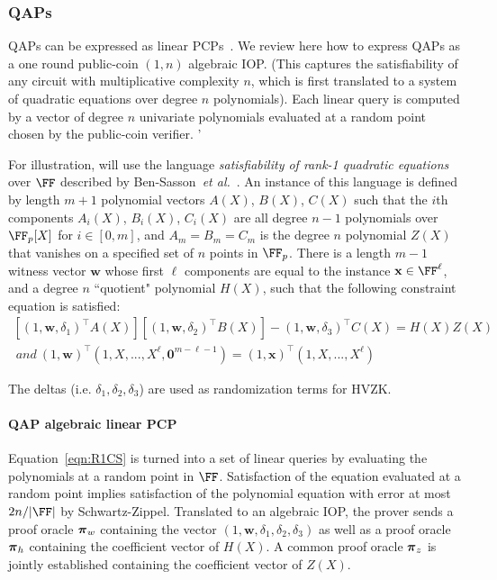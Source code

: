 \subsubsection{QAPs} 

QAPs can be expressed as linear PCPs~\cite{TCC:BCIOP13,C:BCGTV13}. We review here how to express QAPs as a one round public-coin $(1, n)$ algebraic IOP. (This captures the satisfiability of any circuit with multiplicative complexity $n$, which is first translated to a system of quadratic equations over degree $n$ polynomials). Each linear query is computed by a vector of degree $n$ univariate polynomials evaluated at a random point chosen by the public-coin verifier. '

For illustration, will use the language \emph{satisfiability of rank-1 quadratic equations} over $\FF$ described by Ben-Sasson~\emph{et al.}~\cite{C:BCGTV13}. An instance of this language is defined by length $m+1$ polynomial vectors $A(X)$, $B(X)$, $C(X)$ such that the $i$th components $A_i(X)$, $B_i(X)$, $C_i(X)$ are all degree $n-1$ polynomials over $\FF_p[X]$ for $i \in [0,m]$, and $A_m = B_m = C_m$ is the degree $n$ polynomial $Z(X)$ that vanishes on a specified set of $n$ points in $\FF_p$. There is a length $m-1$ witness vector $\mathbf{w}$ whose first $\ell$ components are equal to the instance $\mathbf{x} \in \FF^\ell$, and a degree $n$ ``quotient" polynomial $H(X)$, such that the following constraint equation is satisfied: 
\begin{equation} \label{eqn:R1CS} 
\begin{split}
[(1, \mathbf{w}, \delta_1)^\top A(X)][(1, \mathbf{w}, \delta_2)^\top B(X)] 
- (1, \mathbf{w}, \delta_3)^\top C(X) = H(X)Z(X) \\ 
\ and \ (1,\mathbf{w})^\top (1,X,...,X^{\ell}, \mathbf{0}^{m- \ell -1}) = (1,\mathbf{x})^\top (1, X,...,X^{\ell})
\end{split} 
\end{equation} 

The deltas (i.e. $\delta_1, \delta_2, \delta_3$) are used as randomization terms for HVZK. 

\paragraph{QAP algebraic linear PCP} Equation~\ref{eqn:R1CS} is turned into a set of linear queries by evaluating the polynomials at a random point in $\FF$. Satisfaction of the equation evaluated at a random point implies satisfaction of the polynomial equation with error at most $2n / |\FF|$ by Schwartz-Zippel. Translated to an algebraic IOP, the prover sends a proof oracle $\boldsymbol{\pi}_w$ containing the vector $(1, \mathbf{w}, \delta_1, \delta_2, \delta_3)$ as well as a proof oracle $\boldsymbol{\pi}_h$ containing the coefficient vector of $H(X)$. A common proof oracle $\boldsymbol{\pi}_z$ is jointly established containing the coefficient vector of $Z(X)$. 

